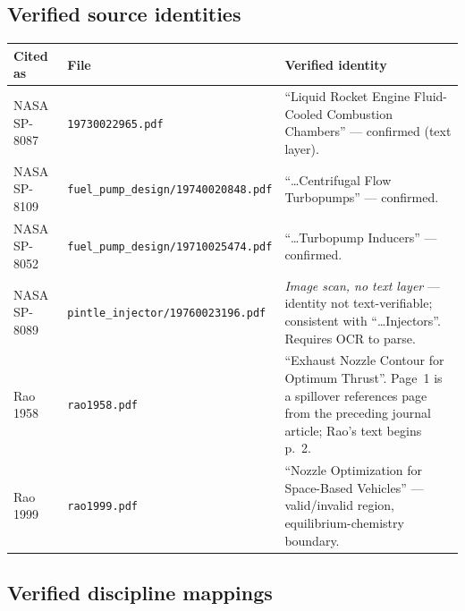 \documentclass[11pt]{article}
\newcommand{\cmd}[1]{\nolinkurl{#1}}
\begin{document}
\subsection{Verified source identities}

\begin{center}
\small
\begin{tabular}{@{}p{2.7cm}p{3.3cm}p{6.9cm}@{}}
\toprule
\textbf{Cited as} & \textbf{File} & \textbf{Verified identity} \\
\midrule
NASA SP-8087 & \cmd{19730022965.pdf} & ``Liquid Rocket Engine Fluid-Cooled Combustion Chambers'' --- confirmed (text layer). \\
NASA SP-8109 & \cmd{fuel\_pump\_design/19740020848.pdf} & ``\dots Centrifugal Flow Turbopumps'' --- confirmed. \\
NASA SP-8052 & \cmd{fuel\_pump\_design/19710025474.pdf} & ``\dots Turbopump Inducers'' --- confirmed. \\
NASA SP-8089 & \cmd{pintle\_injector/19760023196.pdf} & \emph{Image scan, no text layer} --- identity not text-verifiable; consistent with ``\dots Injectors''. Requires OCR to parse. \\
Rao 1958 & \cmd{rao1958.pdf} & ``Exhaust Nozzle Contour for Optimum Thrust''. Page~1 is a spillover references page from the preceding journal article; Rao's text begins p.~2. \\
Rao 1999 & \cmd{rao1999.pdf} & ``Nozzle Optimization for Space-Based Vehicles'' --- valid/invalid region, equilibrium-chemistry boundary. \\
\bottomrule
\end{tabular}
\end{center}

\subsection{Verified discipline mappings}
\end{document}
